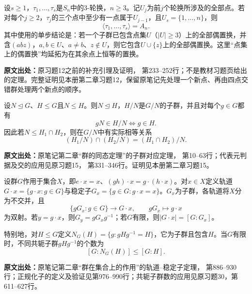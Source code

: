 \begin{reviewlemma}\label{tool:a-triple-attach}
设$s\ge1$，$\tau_1,\ldots,\tau_s$是$S_n$中的3-轮换，$n\ge3$。记$U_j$为前$j$个轮换所涉及的全部点。若对每个$j\ge2$，$\tau_j$的三个点中至少有一点属于$U_{j-1}$，且$U_s=\{1,\ldots,n\}$，则
\[
\langle\tau_1,\ldots,\tau_s\rangle=A_n.
\]
其中使用的单步结论是：若一个子群已包含点集$U$（$|U|\ge3$）上的全部偶置换，并含$(abz)$，$a,b\in U$、$a\ne b$、$z\notin U$，则它包含$U\cup\{z\}$上的全部偶置换。这里“点集上的偶置换”均延拓为在其余点上恒等的置换。

\textbf{原文出处：}原习题12之前的补充引理及证明， 第233--252行；不是教材习题页给出的定理。完整证明见本册第二章习题12，保留原笔记先处理一个新点、再由四点交错群处理两个新点的顺序。
\end{reviewlemma}

\begin{reviewprop}[商子群的代表元判据]\label{tool:a-quotient-membership}
设$N\trianglelefteq G$、$H\le G$且$N\le H$。则$N\trianglelefteq H$，$H/N$是$G/N$的子群，并且对每个$g\in G$都有
\[
gN\in H/N\iff g\in H.
\]
因此若$N\le H_1\cap H_2$，则在$G/N$中有实际相等关系
\[
(H_1/N)\cap(H_2/N)=(H_1\cap H_2)/N.
\]

\textbf{原文出处：}原笔记第二章“群的同态定理”的子群对应定理， 第10--63行；代表元判据及交的应用见原习题15， 第331--346行。证明见本册第二章习题15。
\end{reviewprop}

\begin{reviewtheorem}[轨道、稳定子与共轭子群数]\label{tool:a-orbit-stabilizer}
设群$G$作用于集合$X$，即$e\cdot x=x$、$(gh)\cdot x=g\cdot(h\cdot x)$。对$x\in X$定义轨道$G\cdot x=\{g\cdot x:g\in G\}$与稳定子$G_x=\{g\in G:g\cdot x=x\}$。$G_x$为子群，各轨道将$X$分为不交并，且
\[
\{gG_x:g\in G\}\longrightarrow G\cdot x,
\qquad gG_x\longmapsto g\cdot x
\]
为双射。若$y=g\cdot x$，则$G_y=gG_xg^{-1}$；若$G$有限，则$|G\cdot x|=[G:G_x]$。

特别地，对$H\le G$定义$N_G(H)=\{g:gHg^{-1}=H\}$，它为子群且包含$H$。当$G$有限时，不同共轭子群$gHg^{-1}$的个数为
\[
[G:N_G(H)]\le[G:H].
\]

\textbf{原文出处：}原笔记第二章“群在集合上的作用”的轨道--稳定子定理， 第886--930行；正规化子的定义及验证见第976--990行；共轭子群数的应用见原习题30，第611--627行。
\end{reviewtheorem}

